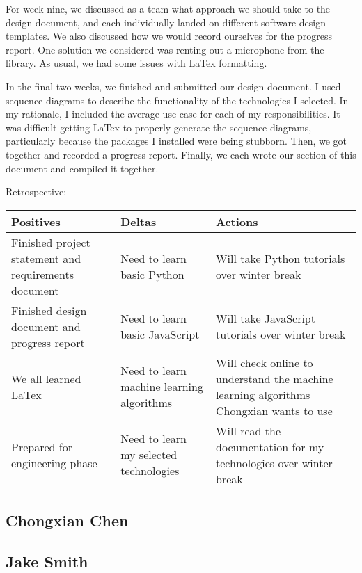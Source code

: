 \documentclass[letterpaper, 10pt,titlepage]{article}
\begin{document}
\par For week nine, we discussed as a team what approach we should take to the design document, and each individually landed on different software design templates. We also discussed how we would record ourselves for the progress report. One solution we considered was renting out a microphone from the library. As usual, we had some issues with LaTex formatting.
\par In the final two weeks, we finished and submitted our design document. I used sequence diagrams to describe the functionality of the technologies I selected. In my rationale, I included the average use case for each of my responsibilities.  It was difficult getting LaTex to properly generate the sequence diagrams, particularly because the packages I installed were being stubborn. Then, we got together and recorded a progress report. Finally, we each wrote our section of this document and compiled it together.


Retrospective:
\begin{center}
    \begin{tabular}{ | l | l | p{3cm} |}
    \hline
    Positives & Deltas & Actions \\ \hline
    Finished project statement and requirements document & Need to learn basic Python & Will take Python tutorials over winter break \\ \hline
    Finished design document and progress report & Need to learn basic JavaScript & Will take JavaScript tutorials over winter break \\ \hline
    We all learned LaTex & Need to learn machine learning algorithms & Will check online to understand the  machine learning algorithms Chongxian wants to use \\ \hline
    Prepared for engineering phase & Need to learn my selected technologies & Will read the documentation for my technologies over winter break \\ \hline
    \end{tabular}
\end{center}




\subsection{Chongxian Chen}
\subsection{Jake Smith}
\end{document}
